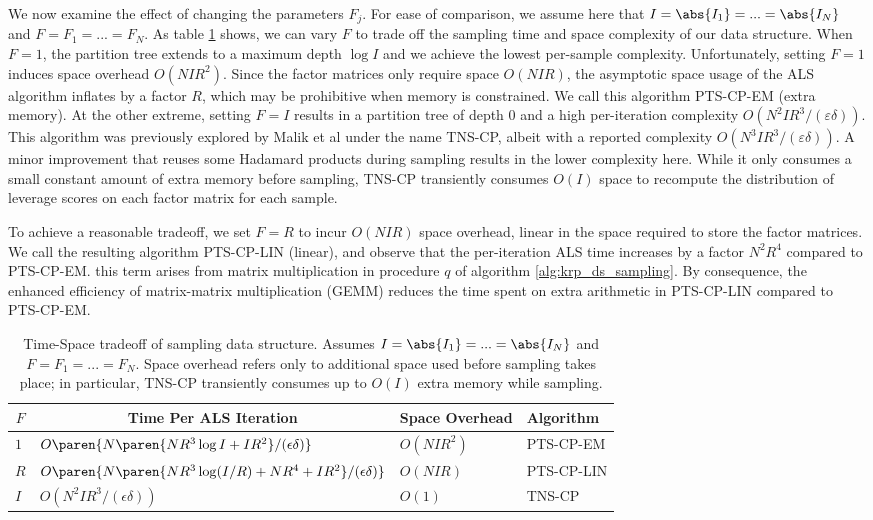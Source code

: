 We now examine the effect of changing the parameters $F_j$. For ease of comparison, we assume here that 
$I = \abs{I_1} = ... = \abs{I_N}$ and $F = F_1 = ... = F_N$. As table \ref{table:f_parameter_effect} shows,
we can vary $F$ to trade off the sampling time and space complexity of our data structure. When $F = 1$, the
partition tree extends to a maximum depth $\log I$ and we achieve the lowest
per-sample complexity. Unfortunately, setting $F=1$ induces space 
overhead $O(N I R^2)$. Since the factor matrices only require space $O(NIR)$, the
asymptotic space usage of the ALS algorithm inflates by a factor $R$, which
may be prohibitive when memory is constrained. We call this algorithm PTS-CP-EM
(extra memory). At the other extreme, setting $F = I$ results in a partition tree
of depth 0 and a high per-iteration complexity $O(N^2 I R^3 / (\varepsilon \delta))$.
This algorithm was previously explored by Malik et al \cite{malik_sdm} under
the name TNS-CP, albeit with a reported complexity 
$O(N^3 I R^3 / (\varepsilon \delta))$. A minor improvement that reuses some 
Hadamard products during sampling results in the lower complexity here. While it
only consumes a small constant amount of extra memory before sampling, TNS-CP
transiently consumes $O(I)$ space to recompute the distribution of leverage
scores on each factor matrix for each sample.

To achieve a reasonable tradeoff, we set $F=R$ to incur $O(NIR)$ space overhead,
linear in the space required to store the factor matrices. We call the resulting
algorithm PTS-CP-LIN (linear), and observe that the per-iteration ALS time increases by
a factor $N^2 R^4$ compared to PTS-CP-EM. this term arises from matrix multiplication in 
procedure $q$ of algorithm \ref{alg:krp_ds_sampling}. By consequence, the enhanced efficiency of matrix-matrix
multiplication (GEMM) reduces the time spent on extra arithmetic in PTS-CP-LIN compared to PTS-CP-EM. 

\begin{table}[]
\centering
\begin{tabular}{|l|l|l|l|}
\hline
\multicolumn{1}{|c|}{\textbf{$F$}} & \multicolumn{1}{c|}{\textbf{Time Per ALS Iteration}} & \multicolumn{1}{c|}{\textbf{Space Overhead}} & \textbf{Algorithm } \\ \hline
$1$       & $O\paren{N \paren{N R^3 \log I + IR^2} / (\epsilon \delta)}$  & $O(NIR^2)$  & PTS-CP-EM  \\
$R$       & $O\paren{N \paren{N R^3 \log (I / R) + NR^4 + IR^2} / (\epsilon \delta)}$  & $O(NIR)$   & PTS-CP-LIN                  \\
$I$       & $O(N^2 I R^3 / (\epsilon \delta))$  & $O(1)$           & TNS-CP                  \\ \hline
\end{tabular}
\vspace{5pt}
\caption{Time-Space tradeoff of sampling data structure. Assumes $I = \abs{I_1} = ... = \abs{I_N}$
and $F = F_1 = ... = F_N$. Space overhead refers only to additional space used before sampling takes place; in
particular, TNS-CP transiently consumes up to $O(I)$ extra memory while sampling.}
\label{table:f_parameter_effect}
\end{table}


